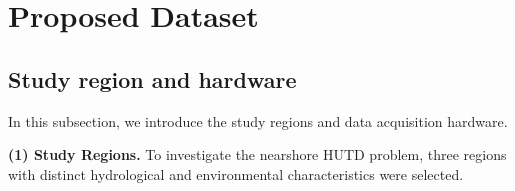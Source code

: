 \section{Proposed Dataset}\label{sec:3} 
\subsection{Study region and hardware}\label{sec:2.1}
In this subsection, we introduce the study regions and data acquisition hardware.
\par
\textbf{(1) Study Regions.}  
To investigate the nearshore HUTD problem, three regions with distinct hydrological and environmental characteristics were selected.  
\par
